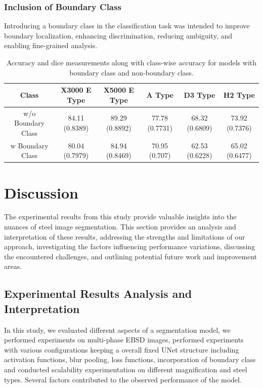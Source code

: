 \documentclass[]{article}
\begin{document}
\subsubsection{Inclusion of Boundary Class}
Introducing a boundary class in the classification task was intended to improve boundary localization, enhancing discrimination, reducing ambiguity, and enabling fine-grained analysis.

\begin{table}[h!]
	\centering
	\begin{tabular}{|c|c|c|c|c|c|}
		\hline
		Class & X3000 E Type & X5000 E Type & A Type & D3 Type & H2 Type \\
		\hline
		\rowcolor{yellow!30} w/o Boundary Class & 84.11 (0.8389) & 89.29 (0.8892) & 77.78 (0.7731) & 68.32 (0.6809) & 73.92 (0.7376) \\
		w Boundary Class & 80.04 (0.7979) & 84.94 (0.8469) & 70.95 (0.707) & 62.53 (0.6228) & 65.02 (0.6477) \\
		\hline
	\end{tabular}
	\caption{Accuracy and dice measurements along with class-wise accuracy for models with boundary class and non-boundary class.}
\end{table}



\section{Discussion}

The experimental results from this study provide valuable insights into the nuances of steel image segmentation. This section provides an analysis and interpretation of these results, addressing the strengths and limitations of our approach, investigating the factors influencing performance variations, discussing the encountered challenges, and outlining potential future work and improvement areas.

\subsection{Experimental Results Analysis and Interpretation}

In this study, we evaluated different aspects of a segmentation model, we performed experiments on multi-phase EBSD images, performed experiments with various configurations keeping a overall fixed UNet structure including activation functions, blur pooling, loss functions, incorporation of boundary class and conducted scalability experimentation on different magnification and steel types. 
Several factors contributed to the observed performance of the model. 
\end{document}
